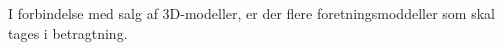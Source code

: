 I forbindelse med salg af 3D-modeller, er der flere foretningsmoddeller som skal tages i betragtning.
